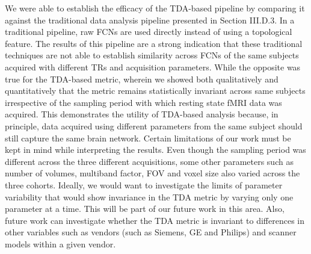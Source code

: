 We were able to establish the efficacy of the TDA-based pipeline by comparing it against the traditional data analysis pipeline presented in Section III.D.3. In a traditional pipeline, raw FCNs are used directly instead of using a topological feature. The results of this pipeline are a strong indication that these traditional techniques are not able to establish similarity across FCNs of the same subjects acquired with different TRs and acquisition parameters. While the opposite was true for the TDA-based metric, wherein we showed both qualitatively and quantitatively that the metric remains statistically invariant across same subjects irrespective of the sampling period with which resting state fMRI data was acquired.
This demonstrates the utility of TDA-based analysis because, in principle, data acquired using different parameters from the same subject should still capture the same brain network. Certain limitations of our work must be kept in mind while interpreting the results. Even though the sampling period was different across the three different acquisitions, some other parameters such as number of volumes, multiband factor, FOV and voxel size also varied across the three cohorts. Ideally, we would want to investigate the limits of parameter variability that would show invariance in the TDA metric by varying only one parameter at a time. This will be part of our future work in this area. Also, future work can investigate whether the TDA metric is invariant to differences in other variables such as vendors (such as Siemens, GE and Philips) and scanner models within a given vendor.



